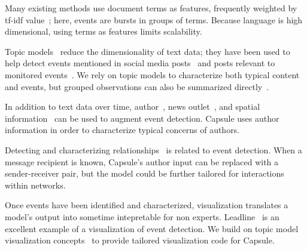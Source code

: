 Many existing methods use document terms as features, frequently weighted by tf-idf value~\cite{fung2005parameter,kumaran2004text,brants2003system,das2011dynamic,zhao2007temporal,zhao2012novel}; here, events are bursts in groups of terms.  Because language is high dimensional, using terms as features limits scalability.

Topic models~\cite{Blei:2012} reduce the dimensionality of text data; they have been used to help detect events mentioned in social media posts~\cite{lau2012line,dou2012leadline} and posts relevant to monitored events~\cite{VanDam:2012}.
We rely on topic models to characterize both typical content and events, but grouped observations can also be summarized directly~\cite{peng2007event,chakrabarti2011event,gao2012joint}.

In addition to text data over time, author~\cite{zhao2007temporal}, news outlet~\cite{wang2007mining}, and spatial information~\cite{Neill:2005,mathioudakis2010identifying,liu2011using} can be used to augment event detection.  Capsule uses author information in order to characterize typical concerns of authors.

Detecting and characterizing relationships~\cite{schein2015bayesian,linderman2014discovering,das2011dynamic} is related to event detection.  When a message recipient is known, Capsule's author input can be replaced with a sender-receiver pair, but the model could be further tailored for interactions within networks.

Once events have been identified and characterized, visualization translates a model's output into sometime intepretable for non experts.  Leadline~\cite{dou2012leadline} is an excellent example of a visualization of event detection.  We build on topic model visualization concepts~\cite{chaney2012visualizing} to provide tailored visualization code for Capsule.